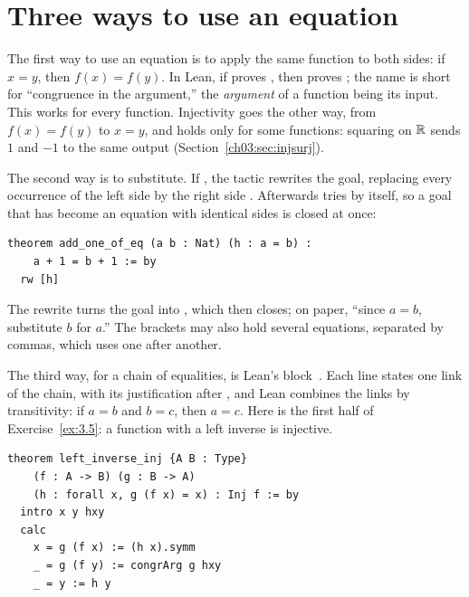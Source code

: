 \section{Three ways to use an equation}\label{ch15:sec:equality}
The first way to use an equation is to apply the same function to both sides: if $x=y$, then $f(x)=f(y)$. In Lean, if  proves , then  proves ; the name is short for ``congruence in the argument,'' the \emph{argument} of a function being its input. This works for every function. Injectivity goes the other way, from $f(x)=f(y)$ to $x=y$, and holds only for some functions: squaring on $\mathbb R$ sends $1$ and $-1$ to the same output (Section~\ref{ch03:sec:injsurj}).

The second way is to substitute. If , the tactic  rewrites the goal, replacing every occurrence of the left side  by the right side . Afterwards  tries  by itself, so a goal that has become an equation with identical sides is closed at once:
\par\noindent\begin{minipage}{\linewidth}
\begin{lstlisting}
theorem add_one_of_eq (a b : Nat) (h : a = b) :
    a + 1 = b + 1 := by
  rw [h]
\end{lstlisting}
\end{minipage}\par
The rewrite turns the goal  into , which  then closes; on paper, ``since $a=b$, substitute $b$ for $a$.'' The brackets may also hold several equations, separated by commas, which  uses one after another.

The third way, for a chain of equalities, is Lean's  block~\cite{leanquant}. Each line states one link of the chain, with its justification after \code{:=}, and Lean combines the links by transitivity: if $a=b$ and $b=c$, then $a=c$. Here is the first half of Exercise~\ref{ex:3.5}: a function with a left inverse is injective.
\par\noindent\begin{minipage}{\linewidth}
\begin{lstlisting}
theorem left_inverse_inj {A B : Type}
    (f : A -> B) (g : B -> A)
    (h : forall x, g (f x) = x) : Inj f := by
  intro x y hxy
  calc
    x = g (f x) := (h x).symm
    _ = g (f y) := congrArg g hxy
    _ = y := h y
\end{lstlisting}
\end{minipage}\par

